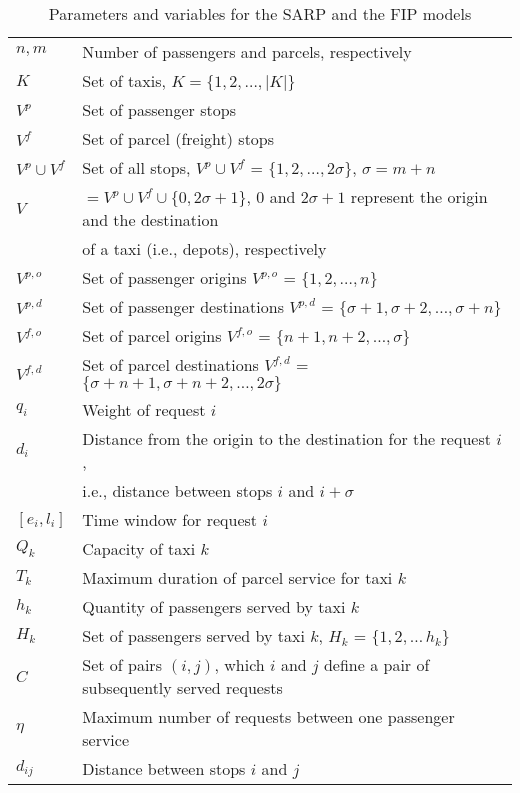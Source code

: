 \documentclass[preprint,authoryear,12pt]{elsarticle}
\begin{document}
\begin{table*}
\caption{Parameters and variables for the SARP and the FIP models}
\small
\begin{tabular}{ll}
\hline
$n,m$ & Number of passengers and parcels, respectively\\
$K$   & Set of taxis, $K=\{1,2,\ldots,|K|\}$\\
$V^p$ & Set of passenger stops\\
$V^f$ & Set of parcel (freight) stops\\
$V^p\cup V^f$ & Set of all stops, $V^p\cup V^f$ = $\{1,2,\ldots,2\sigma\}$, $\sigma=m+n$\\
$V$ & $=V^p\cup V^f \cup \{0,2\sigma+1\}$, $0$ and $2\sigma+1$ represent the origin and the destination\\
& of a taxi (i.e., depots), respectively\\
$V^{p,o}$ & Set of passenger origins $V^{p,o}$ = $\{1,2,\ldots,n\}$\\
$V^{p,d}$ & Set of passenger destinations $V^{p,d}$ = $\{\sigma+1,\sigma+2,\ldots,\sigma+n\}$ \\
$V^{f,o}$ & Set of parcel origins $V^{f,o}$ = $\{n+1,n+2, \dots, \sigma\}$\\
$V^{f,d}$ & Set of parcel destinations $V^{f,d}$ = $\{\sigma+n+1,\sigma+n+2,\ldots,2\sigma\}$\\
$q_i$ & Weight of request $i$\\
$d_i$ & Distance from the origin to the destination for the request $i$, \\
      & i.e., distance between stops $i$ and $i+\sigma$\\
$[e_i, l_i]$& Time window for request $i$\\
$Q_{k}$ & Capacity of taxi $k$\\
$T_k$ & Maximum duration of parcel service for taxi $k$\\
$h_k$ &Quantity of passengers served by taxi $k$\\
$H_k$ & Set of passengers served by taxi $k$, $H_k$ = $\{1,2,\ldots\,h_k\}$\\
$C$ & Set of pairs $(i,j)$, which $i$ and $j$ define a pair of subsequently served requests \\
$\eta$ & Maximum number of requests between one passenger service\\
$d_{ij}$& Distance between stops $i$ and $j$\\

\end{tabular}
\end{table*}
\end{document}
